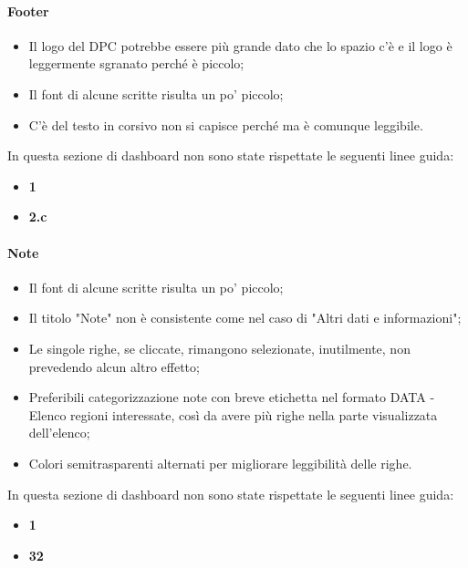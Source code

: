 \paragraph{Footer}
\begin{itemize}
    \item Il logo del DPC potrebbe essere più grande dato che lo spazio c'è e il logo è leggermente sgranato perché è piccolo;
    \item Il font di alcune scritte risulta un po' piccolo;
    \item C'è del testo in corsivo non si capisce perché ma è comunque leggibile.
\end{itemize}
In questa sezione di dashboard non sono state rispettate le seguenti linee guida:
\begin{itemize}
    \item \textbf{1}
    \item \textbf{2.c}
\end{itemize}

\paragraph{Note}
\begin{itemize}
    \item Il font di alcune scritte risulta un po' piccolo;
    \item Il titolo "Note" non è consistente come nel caso di "Altri dati e informazioni";
    \item Le singole righe, se cliccate, rimangono selezionate, inutilmente, non prevedendo alcun altro effetto;
    \item Preferibili categorizzazione note con breve etichetta nel formato DATA - Elenco regioni interessate, così da avere più righe nella parte visualizzata dell'elenco;
    \item Colori semitrasparenti alternati per migliorare leggibilità delle righe.
\end{itemize}
In questa sezione di dashboard non sono state rispettate le seguenti linee guida:
\begin{itemize}
    \item \textbf{1}
    \item \textbf{32}
\end{itemize}

